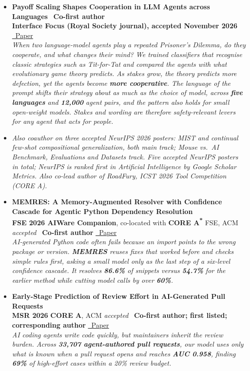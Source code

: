 \documentclass[10pt,a4paper]{article}
\begin{document}
{\begin{itemize}[label={},labelwidth=0pt,labelsep=0pt, itemsep=5pt]
    \item \textbf{Payoff Scaling Shapes Cooperation in LLM Agents across Languages} \quad \faStar\ \textbf{Co-first author}\\[1pt]
    \textbf{Interface Focus (Royal Society journal), accepted November 2026} \quad \href{https://arxiv.org/abs/2601.19082}{\faFilePdf\ Paper}\\[2pt]
    \textit{When two language-model agents play a repeated Prisoner's Dilemma, do they cooperate, and what changes their mind? We trained classifiers that recognise classic strategies such as Tit-for-Tat and compared the agents with what evolutionary game theory predicts. As stakes grow, the theory predicts more defection, yet the agents become \textbf{more cooperative}. The language of the prompt shifts their strategy about as much as the choice of model, across \textbf{five languages} and \textbf{12,000} agent pairs, and the pattern also holds for small open-weight models. Stakes and wording are therefore safety-relevant levers for any agent that acts for people.}
    \item \textit{Also coauthor on three accepted NeurIPS 2026 posters: MIST and continual few-shot compositional generalization, both main track; Mouse vs.\ AI Benchmark, Evaluations and Datasets track. Five accepted NeurIPS posters in total; NeurIPS is ranked first in Artificial Intelligence by Google Scholar Metrics. Also co-lead author of RoadFury, ICST 2026 Tool Competition (CORE A).}
    \item \textbf{MEMRES: A Memory-Augmented Resolver with Confidence Cascade for Agentic Python Dependency Resolution}\\[1pt]
    \textbf{FSE 2026 AIWare Companion}, co-located with \textbf{CORE A\textsuperscript{*}} FSE, ACM \quad \textit{accepted} \quad \faStar\ \textbf{Co-first author} \quad \href{https://arxiv.org/pdf/2604.16941}{\faFilePdf\ Paper}\\[2pt]
    \textit{AI-generated Python code often fails because an import points to the wrong package or version. \textbf{MEMRES} reuses fixes that worked before and checks simple rules first, asking a small model only as the last step of a six-level confidence cascade. It resolves \textbf{86.6\%} of snippets versus \textbf{54.7\%} for the earlier method while cutting model calls by over \textbf{60\%}.}
    \item \textbf{Early-Stage Prediction of Review Effort in AI-Generated Pull Requests}\\[1pt]
    \textbf{MSR 2026} \quad \textbf{CORE A}, ACM \quad \textit{accepted} \quad \faStar\ \textbf{Co-first author; first listed; corresponding author} \quad \href{https://arxiv.org/pdf/2601.00753v2}{\faFilePdf\ Paper}\\[2pt]
    \textit{AI coding agents write code quickly, but maintainers inherit the review burden. Across \textbf{33,707 agent-authored pull requests}, our model uses only what is known when a pull request opens and reaches \textbf{AUC 0.958}, finding \textbf{69\%} of high-effort cases within a 20\% review budget.}
\end{itemize}
}
\end{document}
